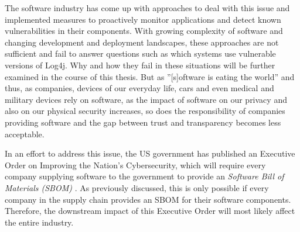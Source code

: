 The software industry has come up with approaches to deal with this issue and implemented measures to proactively monitor applications and detect known vulnerabilities in their components. With growing complexity of software and changing development and deployment landscapes, these approaches are not sufficient and fail to answer questions such as which systems use vulnerable versions of Log4j. Why and how they fail in these situations will be further examined in the course of this thesis. 
But as ''[s]oftware is eating the world''\cite{MarcAndreessen} and thus, as companies, devices of our everyday life, cars and even medical and military devices rely on software, as the impact of software on our privacy and also on our physical security increases, so does the responsibility of companies providing software and the gap between trust and transparency becomes less acceptable.\par
In an effort to address this issue, the US government has published an Executive Order on Improving the Nation's Cybersecurity, which will require every company supplying software to the government to provide an \textit{Software Bill of Materials (SBOM)} \cite{ExecutiveOrderSBOM,NTIASBOM}. As previously discussed, this is only possible if every company in the supply chain provides an SBOM for their software components. Therefore, the downstream impact of this Executive Order will most likely affect the entire industry.

